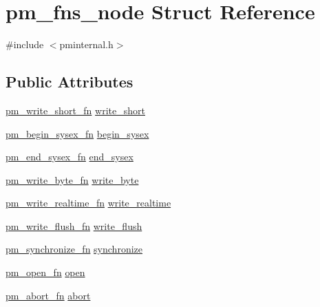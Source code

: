 \hypertarget{structpm__fns__node}{}\section{pm\+\_\+fns\+\_\+node Struct Reference}
\label{structpm__fns__node}


{\ttfamily \#include $<$pminternal.\+h$>$}

\subsection*{Public Attributes}
\begin{DoxyCompactItemize}
\item 
\hyperlink{pminternal_8h_ae52df9847c472f718020fed71a94b6cb}{pm\+\_\+write\+\_\+short\+\_\+fn} \hyperlink{structpm__fns__node_a9ab405eee09c3e4ee7e145c3d0b20d44}{write\+\_\+short}
\item 
\hyperlink{pminternal_8h_a3b94c86f5a6c5544d1c037e707a557ff}{pm\+\_\+begin\+\_\+sysex\+\_\+fn} \hyperlink{structpm__fns__node_a7374e2a3111143034266df5025dbd55d}{begin\+\_\+sysex}
\item 
\hyperlink{pminternal_8h_af061c571def6637fac1fb2457a9f9f9d}{pm\+\_\+end\+\_\+sysex\+\_\+fn} \hyperlink{structpm__fns__node_a352068a30a5315dc035c67a89a063acc}{end\+\_\+sysex}
\item 
\hyperlink{pminternal_8h_a86b7abf2ae0e75bbda37777ce113db4a}{pm\+\_\+write\+\_\+byte\+\_\+fn} \hyperlink{structpm__fns__node_af5b068dc9632efbb967b37f2fbb65d75}{write\+\_\+byte}
\item 
\hyperlink{pminternal_8h_ac4d27282ee15bbb9b80782f6012831bf}{pm\+\_\+write\+\_\+realtime\+\_\+fn} \hyperlink{structpm__fns__node_a43aa6c0c76ae0d235fde4a0afce51cf8}{write\+\_\+realtime}
\item 
\hyperlink{pminternal_8h_a701f5f85e2e3302183c8c8dd880660c6}{pm\+\_\+write\+\_\+flush\+\_\+fn} \hyperlink{structpm__fns__node_a507449c19eee96a72872fb16c443b197}{write\+\_\+flush}
\item 
\hyperlink{pminternal_8h_a0447341c59b5ba1646366f317b97c084}{pm\+\_\+synchronize\+\_\+fn} \hyperlink{structpm__fns__node_add292a3d1444e53bd42a71e9f9fad60c}{synchronize}
\item 
\hyperlink{pminternal_8h_abd2d46d3317d479f2677a05ec42fa77c}{pm\+\_\+open\+\_\+fn} \hyperlink{structpm__fns__node_a05cf57c08b47348d05637bfe1da193d2}{open}
\item 
\hyperlink{pminternal_8h_a571c70ad6d36484c088626ea13b8f21f}{pm\+\_\+abort\+\_\+fn} \hyperlink{structpm__fns__node_ae0ce4cd25fc61fc3ccb1a56995abe625}{abort}

\end{DoxyCompactItemize}
